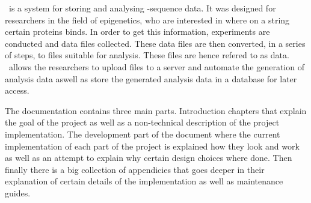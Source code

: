 \appName\ is a system for storing and analysing -sequence data. It was designed for researchers in the field of epigenetics, who are interested in where on a  string certain proteins binds. In order to get this information, experiments are conducted and  data files collected. These data files are then converted, in a series of steps, to files suitable for analysis. These files are hence refered to as  data. \appName\ allows the researchers to upload  files to a server and automate the generation of analysis data aswell as store the generated analysis data in a database for later access. 

The documentation contains three main parts. Introduction chapters that explain the goal of the project as well as a non-technical description of the project implementation. The development part of the document where the current implementation of each part of the project is explained how they look and work as well as an attempt to explain why certain design choices where done. Then finally there is a big collection of appendicies that goes deeper in their explanation of certain details of the implementation as well as maintenance guides.

